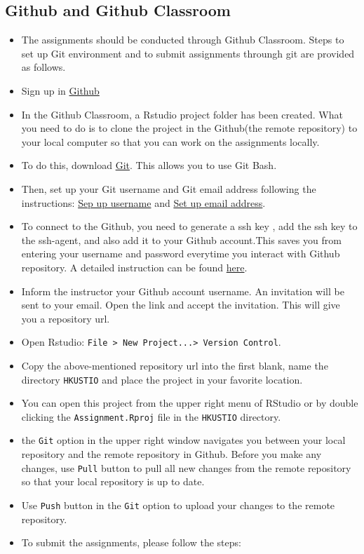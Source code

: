 \documentclass[
]{book}
\begin{document}
\hypertarget{github-and-github-classroom}{%
\subsection{Github and Github Classroom}\label{github-and-github-classroom}}

\begin{itemize}
\item
  The assignments should be conducted through Github Classroom. Steps to set up Git environment and to submit assignments throungh git are provided as follows.
\item
  Sign up in \href{https://github.com/}{Github}
\item
  In the Github Classroom, a Rstudio project folder has been created. What you need to do is to clone the project in the Github(the remote repository) to your local computer so that you can work on the assignments locally.
\item
  To do this, download \href{https://git-scm.com/download/win}{Git}. This allows you to use Git Bash.
\item
  Then, set up your Git username and Git email address following the instructions: \href{https://docs.github.com/en/github/using-git/setting-your-username-in-git}{Sep up username} and \href{https://docs.github.com/en/github/setting-up-and-managing-your-github-user-account/setting-your-commit-email-address}{Set up email address}.
\item
  To connect to the Github, you need to generate a ssh key , add the ssh key to the ssh-agent, and also add it to your Github account.This saves you from entering your username and password everytime you interact with Github repository. A detailed instruction can be found \href{https://docs.github.com/en/github/authenticating-to-github/connecting-to-github-with-ssh}{here}.
\item
  Inform the instructor your Github account username. An invitation will be sent to your email. Open the link and accept the invitation. This will give you a repository url.
\item
  Open Rstudio: \texttt{File\ \textgreater{}\ New\ Project...\textgreater{}\ Version\ Control}.
\item
  Copy the above-mentioned repository url into the first blank, name the directory \texttt{HKUSTIO} and place the project in your favorite location.
\item
  You can open this project from the upper right menu of RStudio or by double clicking the \texttt{Assignment.Rproj} file in the \texttt{HKUSTIO} directory.
\item
  the \texttt{Git} option in the upper right window navigates you between your local repository and the remote repository in Github. Before you make any changes, use \texttt{Pull} button to pull all new changes from the remote repository so that your local repository is up to date.
\item
  Use \texttt{Push} button in the \texttt{Git} option to upload your changes to the remote repository.
\item
  To submit the assignments, please follow the steps:


\end{itemize}
\end{document}
